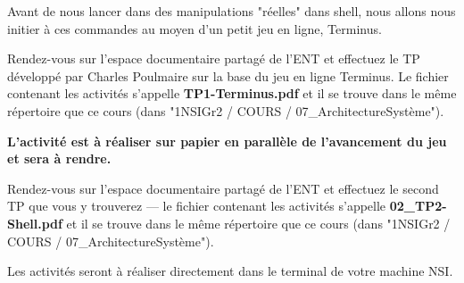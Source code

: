 \documentclass[12pt]{article}
\begin{document}
	\begin{MonExo}
		Avant de nous lancer dans des manipulations "réelles" dans shell, nous allons nous initier à ces commandes au moyen d'un petit jeu en ligne, Terminus.
		\vspace{\baselineskip}
		
		Rendez-vous sur l'espace documentaire partagé de l'ENT et effectuez le TP développé par Charles Poulmaire sur la base du jeu en ligne Terminus. Le fichier contenant les activités s'appelle \textbf{TP1-Terminus.pdf} et il se trouve dans le même répertoire que ce cours (dans "1NSIGr2 / COURS / 07\_ArchitectureSystème").
		\vspace{\baselineskip}
		
		\textbf{L'activité est à réaliser sur papier en parallèle de l'avancement du jeu et sera à rendre.}
	\end{MonExo}
	 
	 \begin{MonExo}
	 	Rendez-vous sur l'espace documentaire partagé de l'ENT et effectuez le second TP que vous y trouverez --- le fichier contenant les activités s'appelle \textbf{02\_TP2-Shell.pdf} et il se trouve dans le même répertoire que ce cours (dans "1NSIGr2 / COURS / 07\_ArchitectureSystème").
	 	
	 	Les activités seront à réaliser directement dans le terminal de votre machine NSI.
	 \end{MonExo}
	 
\end{document}
